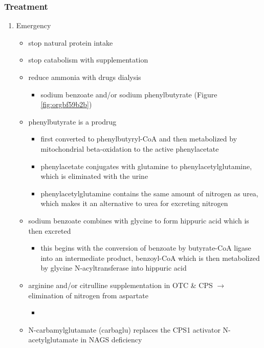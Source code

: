 \documentclass[12pt]{scrartcl}
\begin{document}
\begin{center}
\begin{center}
\subsubsection{Treatment}
\label{sec:org00a2a2c}
\begin{enumerate}
\item Emergency
\label{sec:orgc75ba90}
\begin{itemize}
\item stop natural protein intake
\item stop catabolism with supplementation
\item reduce ammonia with drugs \textpm{} dialysis
\begin{itemize}
\item sodium benzoate and/or sodium phenylbutyrate (Figure \ref{fig:orgbf59b2b})
\end{itemize}

\item phenylbutyrate is a prodrug
\begin{itemize}
\item first converted to phenylbutyryl-CoA and then metabolized by mitochondrial
beta-oxidation to the active phenylacetate
\item phenylacetate conjugates with glutamine to phenylacetylglutamine,
which is eliminated with the urine
\item phenylacetylglutamine contains the same amount of nitrogen as
urea, which makes it an alternative to urea for excreting nitrogen
\end{itemize}

\item sodium benzoate combines with glycine to form hippuric acid which is
then excreted
\begin{itemize}
\item this begins with the conversion of benzoate by butyrate-CoA ligase
into an intermediate product, benzoyl-CoA which is then
metabolized by glycine N-acyltransferase into hippuric acid
\end{itemize}
\item arginine and/or citrulline supplementation in OTC \& CPS \(\to\) elimination of nitrogen from aspartate
\begin{itemize}
\item {}
\end{itemize}
\item N-carbamylglutamate (carbaglu) replaces the CPS1 activator N-acetylglutamate in NAGS deficiency
\end{itemize}




\end{enumerate}
\end{center}
\end{center}
\end{document}
